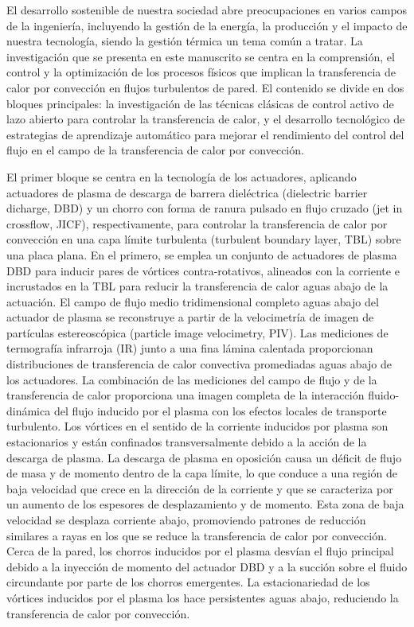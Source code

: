 \begin{abstrakt}

	\noindent El desarrollo sostenible de nuestra sociedad abre preocupaciones en varios campos de la ingeniería, incluyendo la gestión de la energía, la producción y el impacto de nuestra tecnología, siendo la gestión térmica un tema común a tratar. La investigación que se presenta en este manuscrito se centra en la comprensión, el control y la optimización de los procesos físicos que implican la transferencia de calor por convección en flujos turbulentos de pared. El contenido se divide en dos bloques principales: la investigación de las técnicas clásicas de control activo de lazo abierto para controlar la transferencia de calor, y el desarrollo tecnológico de estrategias de aprendizaje automático para mejorar el rendimiento del control del flujo en el campo de la transferencia de calor por convección. 
    
    
    El primer bloque se centra en la tecnología de los actuadores, aplicando actuadores de plasma de descarga de barrera dieléctrica (dielectric barrier dicharge, DBD) y un chorro con forma de ranura pulsado en flujo cruzado (jet in crossflow, JICF), respectivamente, para controlar la transferencia de calor por convección en una capa límite turbulenta (turbulent boundary layer, TBL) sobre una placa plana. En el primero, se emplea un conjunto de actuadores de plasma DBD para inducir pares de vórtices contra-rotativos, alineados con la corriente e incrustados en la TBL para reducir la transferencia de calor aguas abajo de la actuación. El campo de flujo medio tridimensional completo aguas abajo del actuador de plasma se reconstruye a partir de la velocimetría de imagen de partículas estereoscópica (particle image velocimetry, PIV). Las mediciones de termografía infrarroja (IR) junto a una fina lámina calentada proporcionan distribuciones de transferencia de calor convectiva promediadas aguas abajo de los actuadores. La combinación de las mediciones del campo de flujo y de la transferencia de calor proporciona una imagen completa de la interacción fluido-dinámica del flujo inducido por el plasma con los efectos locales de transporte turbulento. Los vórtices en el sentido de la corriente inducidos por plasma son estacionarios y están confinados transversalmente debido a la acción de la descarga de plasma. La descarga de plasma en oposición causa un déficit de flujo de masa y de momento dentro de la capa límite, lo que conduce a una región de baja velocidad que crece en la dirección de la corriente y que se caracteriza por un aumento de los espesores de desplazamiento y de momento. Esta zona de baja velocidad se desplaza corriente abajo, promoviendo patrones de reducción similares a rayas en los que se reduce la transferencia de calor por convección. Cerca de la pared, los chorros inducidos por el plasma desvían el flujo principal debido a la inyección de momento del actuador DBD y a la succión sobre el fluido circundante por parte de los chorros emergentes. La estacionariedad de los vórtices inducidos por el plasma los hace persistentes aguas abajo, reduciendo la transferencia de calor por convección.
    

\end{abstrakt}
